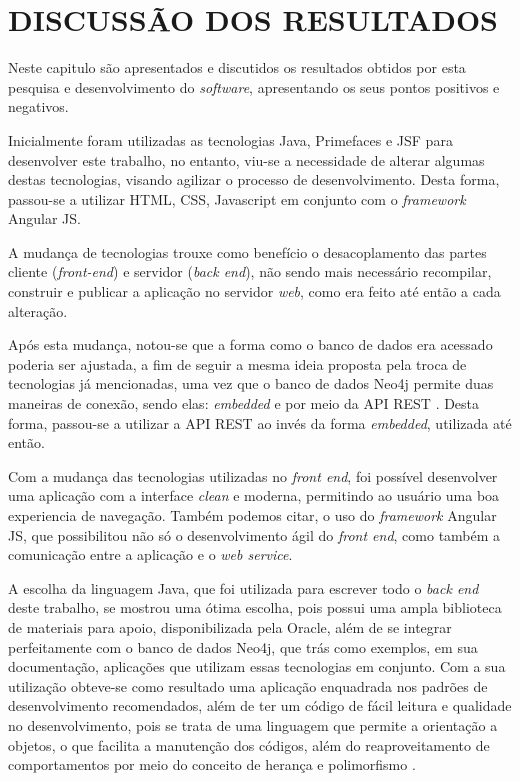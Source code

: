 
\chapter{DISCUSSÃO DOS RESULTADOS} 

\par Neste capitulo são apresentados e discutidos os resultados obtidos por esta pesquisa e desenvolvimento do \textit{software}, apresentando os seus pontos positivos e negativos.

\par Inicialmente foram utilizadas as tecnologias Java, Primefaces e JSF para desenvolver este trabalho, no entanto, viu-se a necessidade de alterar algumas destas tecnologias, visando agilizar o processo de desenvolvimento. Desta forma, passou-se a utilizar HTML, CSS, Javascript em conjunto com o \textit{framework} Angular JS.

\par A mudança de tecnologias trouxe como benefício o desacoplamento das partes cliente (\textit{front-end}) e servidor (\textit{back end}), não sendo mais necessário recompilar, construir e publicar a aplicação no servidor \textit{web}, como era feito até então a cada alteração.

\par Após esta mudança, notou-se que a forma como o banco de dados era acessado poderia ser ajustada, a fim de seguir a mesma ideia proposta pela troca de tecnologias já mencionadas, uma vez que o banco de dados Neo4j permite duas maneiras de conexão, sendo elas: \textit{embedded} e por meio da API REST \cite{robinson_webber_eifrem_graph_databases}. Desta forma, passou-se a utilizar a API REST ao invés da forma \textit{embedded}, utilizada até então.

\par Com a mudança das tecnologias utilizadas no \textit{front end}, foi possível desenvolver uma aplicação com a interface \textit{clean} e moderna, permitindo ao usuário uma boa experiencia de navegação. Também podemos citar, o uso do \textit{framework} Angular JS, que possibilitou não só o desenvolvimento ágil do \textit{front end}, como também a comunicação entre a aplicação e o \textit{web service}.

\par A escolha da linguagem Java, que foi utilizada para escrever todo o \textit{back end} deste trabalho, se mostrou uma ótima escolha, pois possui uma ampla biblioteca de materiais para apoio, disponibilizada pela Oracle, além de se integrar perfeitamente com o banco de dados Neo4j, que trás como exemplos, em sua documentação, aplicações que utilizam essas tecnologias em conjunto. Com a sua utilização obteve-se como resultado uma aplicação enquadrada nos padrões de desenvolvimento recomendados, além de ter um código de fácil leitura e qualidade no desenvolvimento, pois se trata de uma linguagem que permite a orientação a objetos, o que facilita a manutenção dos códigos, além do reaproveitamento de comportamentos por meio do conceito de herança e polimorfismo \cite{schildt_java_complete_reference}.


